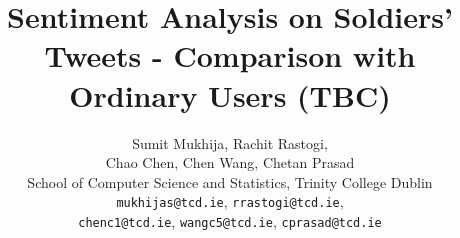 \documentclass[english,a4paper,11pt]{article}
\title{Sentiment Analysis on Soldiers' Tweets - Comparison with Ordinary Users (TBC)}
\date{}
\author{
  Sumit Mukhija, Rachit Rastogi,\\
  Chao Chen, Chen Wang, Chetan Prasad\\
  School of Computer Science and Statistics, Trinity College Dublin\\
  \texttt{mukhijas@tcd.ie}, \texttt{rrastogi@tcd.ie},\\
  \texttt{chenc1@tcd.ie}, \texttt{wangc5@tcd.ie}, \texttt{cprasad@tcd.ie}
}
\begin{document}
\maketitle
\thispagestyle{empty}
\pagestyle{empty}

\begin{abstract}

\end{abstract}








\printbibliography
\end{document}
